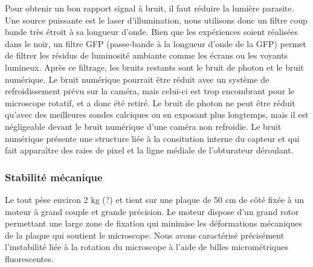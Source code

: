 Pour obtenir un bon rapport signal à bruit, il faut réduire la lumière parasite. Une source puissante est le laser d'illumination, nous utilisons donc un filtre coup bande très étroit à sa longueur d'onde. Bien que les expériences soient réalisées dans le noir, un filtre GFP (passe-bande à la longueur d'onde de la GFP) permet de filtrer les résidus de luminosité ambiante comme les écrans ou les voyants lumineux. Après ce filtrage, les bruits restants sont le bruit de photon et le bruit numérique. Le bruit numérique pourrait être réduit avec un système de refroidissement prévu sur la caméra, mais celui-ci est trop encombrant pour le microscope rotatif, et a donc été retiré. Le bruit de photon ne peut être réduit qu'avec des meilleures sondes calciques ou en exposant plus longtemps, mais il est négligeable devant le bruit numérique d'une caméra non refroidie. Le bruit numérique présente une structure liée à la consitution interne du capteur et qui fait apparaître des raies de pixel et la ligne médiale de l'obturateur déroulant.



\subsubsection{Stabilité mécanique}

Le tout pèse environ 2 kg (?) et tient sur une plaque de 50 cm de côté fixée à un moteur à grand couple et grande précision. Le moteur dispose d'un grand rotor permettant une large zone de fixation qui minimise les déformations mécaniques de la plaque qui soutient le microscope. Nous avons caractérisé précisément l'instabilité liée à la rotation du microscope à l'aide de billes micrométriques fluorescentes.

